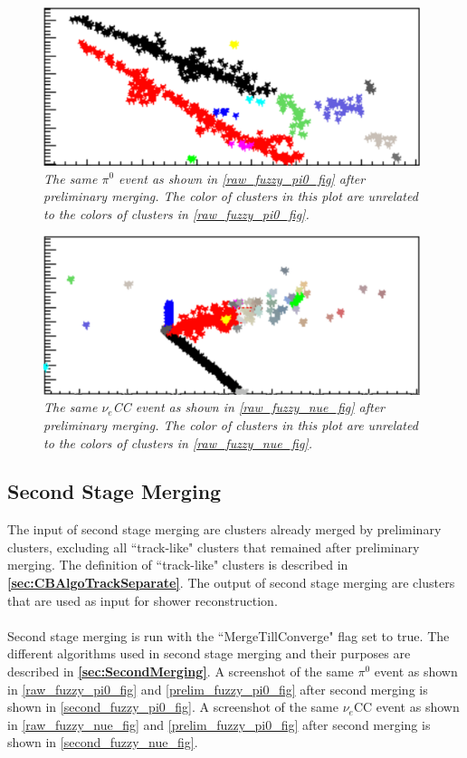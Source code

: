 \documentclass{article}
\begin{document}
\begin{figure}[h!]
\begin{center}
\includegraphics[width=110mm]{Figures/prelim_fuzzy_pi0.png}
\end{center}
\caption{\textit{The same $\pi^0$ event as shown in \autoref{raw_fuzzy_pi0_fig} after preliminary merging. The color of clusters in this plot are unrelated to the colors of clusters in \autoref{raw_fuzzy_pi0_fig}.}}
\label{prelim_fuzzy_pi0_fig}
\end{figure}

\begin{figure}[h!]
\begin{center}
\includegraphics[width=110mm]{Figures/prelim_fuzzy_nue.png}
\end{center}
\caption{\textit{The same $\nu_e$CC event as shown in \autoref{raw_fuzzy_nue_fig} after preliminary merging. The color of clusters in this plot are unrelated to the colors of clusters in \autoref{raw_fuzzy_nue_fig}.}}
\label{prelim_fuzzy_nue_fig}
\end{figure}

\subsection{Second Stage Merging}
The input of second stage merging are clusters already merged by preliminary clusters, excluding all ``track-like" clusters that remained after preliminary merging. The definition of ``track-like" clusters is described in \textbf{\autoref{sec:CBAlgoTrackSeparate}}. The output of second stage merging are clusters that are used as input for shower reconstruction.\\\\
Second stage merging is run with the ``MergeTillConverge" flag set to true. The different algorithms used in second stage merging and their purposes are described in \textbf{\autoref{sec:SecondMerging}}. A screenshot of the same $\pi^0$ event as shown in \autoref{raw_fuzzy_pi0_fig} and \autoref{prelim_fuzzy_pi0_fig} after second merging is shown in \autoref{second_fuzzy_pi0_fig}.  A screenshot of the same $\nu_e$CC event as shown in \autoref{raw_fuzzy_nue_fig} and \autoref{prelim_fuzzy_pi0_fig} after second merging is shown in \autoref{second_fuzzy_nue_fig}.
\end{document}
